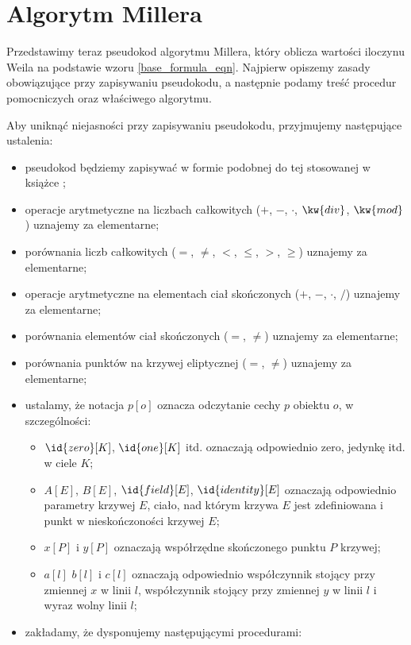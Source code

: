 \section{Algorytm Millera}

\noindent
Przedstawimy teraz pseudokod algorytmu Millera,
który oblicza wartości iloczynu Weila
na podstawie wzoru \ref{base_formula_eqn}.
Najpierw opiszemy zasady obowiązujące przy zapisywaniu pseudokodu,
a następnie podamy treść procedur pomocniczych
oraz właściwego algorytmu.

\begin{remark}
Aby uniknąć niejasności przy zapisywaniu pseudokodu,
przyjmujemy następujące ustalenia:
\begin{itemize}
\item pseudokod będziemy zapisywać w formie podobnej do tej
stosowanej w książce \cite{clrs};
\item operacje arytmetyczne na liczbach całkowitych
($+$, $-$, $\cdot$, $\kw{div}$, $\kw{mod}$)
uznajemy za elementarne;
\item porównania liczb całkowitych
($=$, $\neq$, $<$, $\leq$, $>$, $\geq$)
uznajemy za elementarne;
\item operacje arytmetyczne na elementach ciał skończonych
($+$, $-$, $\cdot$, $/$)
uznajemy za elementarne;
\item porównania elementów ciał skończonych
($=$, $\neq$)
uznajemy za elementarne;
\item porównania punktów na krzywej eliptycznej
($=$, $\neq$)
uznajemy za elementarne;
\item ustalamy, że notacja $p[o]$ oznacza odczytanie cechy $p$ obiektu $o$,
w szczególności:
\begin{itemize}
\item $\id{zero}[K]$, $\id{one}[K]$ itd.
oznaczają odpowiednio
zero, jedynkę itd. w ciele $K$;
\item $A[E]$, $B[E]$, $\id{field}[E]$, $\id{identity}[E]$
oznaczają odpowiednio
parametry krzywej $E$, ciało, nad którym krzywa $E$ jest zdefiniowana
i punkt w nieskończoności krzywej $E$;
\item $x[P]$ i $y[P]$ oznaczają współrzędne skończonego punktu $P$ krzywej;
\item $a[l]$ $b[l]$ i $c[l]$ oznaczają odpowiednio
współczynnik stojący przy zmiennej $x$ w linii $l$,
współczynnik stojący przy zmiennej $y$ w linii $l$
i wyraz wolny linii $l$;
\end{itemize}
\item zakładamy, że dysponujemy następującymi procedurami:

\end{itemize}
\end{remark}
